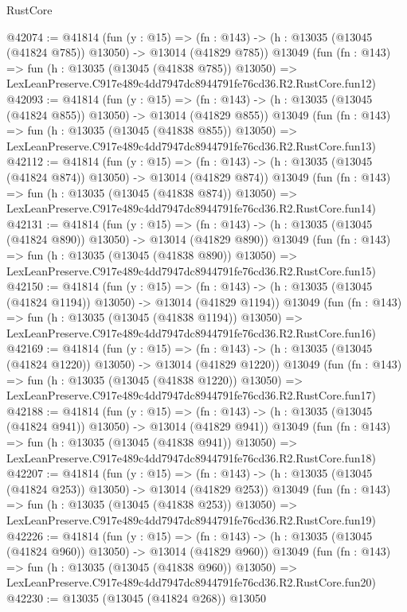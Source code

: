 \begin{lexlean}{RustCore}
\begin{coremodule}
@42074 := @41814
    (fun (y : @15) =>
    (fn : @143) -> (h : @13035 (@13045 (@41824 @785)) @13050) -> @13014 (@41829 @785))
    @13049
    (fun (fn : @143) =>
    fun (h : @13035 (@13045 (@41838 @785)) @13050) =>
    LexLeanPreserve.C917e489c4dd7947dc8944791fe76cd36.R2.RustCore.fun12)
@42093 := @41814
    (fun (y : @15) =>
    (fn : @143) -> (h : @13035 (@13045 (@41824 @855)) @13050) -> @13014 (@41829 @855))
    @13049
    (fun (fn : @143) =>
    fun (h : @13035 (@13045 (@41838 @855)) @13050) =>
    LexLeanPreserve.C917e489c4dd7947dc8944791fe76cd36.R2.RustCore.fun13)
@42112 := @41814
    (fun (y : @15) =>
    (fn : @143) -> (h : @13035 (@13045 (@41824 @874)) @13050) -> @13014 (@41829 @874))
    @13049
    (fun (fn : @143) =>
    fun (h : @13035 (@13045 (@41838 @874)) @13050) =>
    LexLeanPreserve.C917e489c4dd7947dc8944791fe76cd36.R2.RustCore.fun14)
@42131 := @41814
    (fun (y : @15) =>
    (fn : @143) -> (h : @13035 (@13045 (@41824 @890)) @13050) -> @13014 (@41829 @890))
    @13049
    (fun (fn : @143) =>
    fun (h : @13035 (@13045 (@41838 @890)) @13050) =>
    LexLeanPreserve.C917e489c4dd7947dc8944791fe76cd36.R2.RustCore.fun15)
@42150 := @41814
    (fun (y : @15) =>
    (fn : @143) -> (h : @13035 (@13045 (@41824 @1194)) @13050) -> @13014 (@41829 @1194))
    @13049
    (fun (fn : @143) =>
    fun (h : @13035 (@13045 (@41838 @1194)) @13050) =>
    LexLeanPreserve.C917e489c4dd7947dc8944791fe76cd36.R2.RustCore.fun16)
@42169 := @41814
    (fun (y : @15) =>
    (fn : @143) -> (h : @13035 (@13045 (@41824 @1220)) @13050) -> @13014 (@41829 @1220))
    @13049
    (fun (fn : @143) =>
    fun (h : @13035 (@13045 (@41838 @1220)) @13050) =>
    LexLeanPreserve.C917e489c4dd7947dc8944791fe76cd36.R2.RustCore.fun17)
@42188 := @41814
    (fun (y : @15) =>
    (fn : @143) -> (h : @13035 (@13045 (@41824 @941)) @13050) -> @13014 (@41829 @941))
    @13049
    (fun (fn : @143) =>
    fun (h : @13035 (@13045 (@41838 @941)) @13050) =>
    LexLeanPreserve.C917e489c4dd7947dc8944791fe76cd36.R2.RustCore.fun18)
@42207 := @41814
    (fun (y : @15) =>
    (fn : @143) -> (h : @13035 (@13045 (@41824 @253)) @13050) -> @13014 (@41829 @253))
    @13049
    (fun (fn : @143) =>
    fun (h : @13035 (@13045 (@41838 @253)) @13050) =>
    LexLeanPreserve.C917e489c4dd7947dc8944791fe76cd36.R2.RustCore.fun19)
@42226 := @41814
    (fun (y : @15) =>
    (fn : @143) -> (h : @13035 (@13045 (@41824 @960)) @13050) -> @13014 (@41829 @960))
    @13049
    (fun (fn : @143) =>
    fun (h : @13035 (@13045 (@41838 @960)) @13050) =>
    LexLeanPreserve.C917e489c4dd7947dc8944791fe76cd36.R2.RustCore.fun20)
@42230 := @13035 (@13045 (@41824 @268)) @13050

\end{coremodule}
\end{lexlean}
